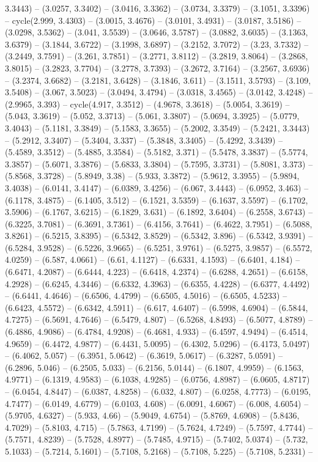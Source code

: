 3.3443) -- (3.0257, 3.3402) -- (3.0416, 3.3362) -- (3.0734, 3.3379) -- (3.1051, 3.3396) -- cycle(2.999, 3.4303) -- (3.0015, 3.4676) -- (3.0101, 3.4931) -- (3.0187, 3.5186) -- (3.0298, 3.5362) -- (3.041, 3.5539) -- (3.0646, 3.5787) -- (3.0882, 3.6035) -- (3.1363, 3.6379) -- (3.1844, 3.6722) -- (3.1998, 3.6897) -- (3.2152, 3.7072) -- (3.23, 3.7332) -- (3.2449, 3.7591) -- (3.261, 3.7851) -- (3.2771, 3.8112) -- (3.2819, 3.8064) -- (3.2868, 3.8015) -- (3.2823, 3.7704) -- (3.2778, 3.7393) -- (3.2672, 3.7164) -- (3.2567, 3.6936) -- (3.2374, 3.6682) -- (3.2181, 3.6428) -- (3.1846, 3.611) -- (3.1511, 3.5793) -- (3.109, 3.5408) -- (3.067, 3.5023) -- (3.0494, 3.4794) -- (3.0318, 3.4565) -- (3.0142, 3.4248) -- (2.9965, 3.393) -- cycle(4.917, 3.3512) -- (4.9678, 3.3618) -- (5.0054, 3.3619) -- (5.043, 3.3619) -- (5.052, 3.3713) -- (5.061, 3.3807) -- (5.0694, 3.3925) -- (5.0779, 3.4043) -- (5.1181, 3.3849) -- (5.1583, 3.3655) -- (5.2002, 3.3549) -- (5.2421, 3.3443) -- (5.2912, 3.3407) -- (5.3404, 3.337) -- (5.3848, 3.3405) -- (5.4292, 3.3439) -- (5.4589, 3.3512) -- (5.4885, 3.3584) -- (5.5182, 3.371) -- (5.5478, 3.3837) -- (5.5774, 3.3857) -- (5.6071, 3.3876) -- (5.6833, 3.3804) -- (5.7595, 3.3731) -- (5.8081, 3.373) -- (5.8568, 3.3728) -- (5.8949, 3.38) -- (5.933, 3.3872) -- (5.9612, 3.3955) -- (5.9894, 3.4038) -- (6.0141, 3.4147) -- (6.0389, 3.4256) -- (6.067, 3.4443) -- (6.0952, 3.463) -- (6.1178, 3.4875) -- (6.1405, 3.512) -- (6.1521, 3.5359) -- (6.1637, 3.5597) -- (6.1702, 3.5906) -- (6.1767, 3.6215) -- (6.1829, 3.631) -- (6.1892, 3.6404) -- (6.2558, 3.6743) -- (6.3225, 3.7081) -- (6.3691, 3.7361) -- (6.4156, 3.7641) -- (6.4622, 3.7951) -- (6.5088, 3.8261) -- (6.5215, 3.8395) -- (6.5342, 3.8529) -- (6.5342, 3.896) -- (6.5342, 3.9391) -- (6.5284, 3.9528) -- (6.5226, 3.9665) -- (6.5251, 3.9761) -- (6.5275, 3.9857) -- (6.5572, 4.0259) -- (6.587, 4.0661) -- (6.61, 4.1127) -- (6.6331, 4.1593) -- (6.6401, 4.184) -- (6.6471, 4.2087) -- (6.6444, 4.223) -- (6.6418, 4.2374) -- (6.6288, 4.2651) -- (6.6158, 4.2928) -- (6.6245, 4.3446) -- (6.6332, 4.3963) -- (6.6355, 4.4228) -- (6.6377, 4.4492) -- (6.6441, 4.4646) -- (6.6506, 4.4799) -- (6.6505, 4.5016) -- (6.6505, 4.5233) -- (6.6423, 4.5572) -- (6.6342, 4.5911) -- (6.617, 4.6407) -- (6.5998, 4.6904) -- (6.5844, 4.7275) -- (6.5691, 4.7646) -- (6.5479, 4.807) -- (6.5268, 4.8493) -- (6.5077, 4.8789) -- (6.4886, 4.9086) -- (6.4784, 4.9208) -- (6.4681, 4.933) -- (6.4597, 4.9494) -- (6.4514, 4.9659) -- (6.4472, 4.9877) -- (6.4431, 5.0095) -- (6.4302, 5.0296) -- (6.4173, 5.0497) -- (6.4062, 5.057) -- (6.3951, 5.0642) -- (6.3619, 5.0617) -- (6.3287, 5.0591) -- (6.2896, 5.046) -- (6.2505, 5.033) -- (6.2156, 5.0144) -- (6.1807, 4.9959) -- (6.1563, 4.9771) -- (6.1319, 4.9583) -- (6.1038, 4.9285) -- (6.0756, 4.8987) -- (6.0605, 4.8717) -- (6.0454, 4.8447) -- (6.0387, 4.8258) -- (6.032, 4.807) -- (6.0258, 4.7773) -- (6.0195, 4.7477) -- (6.0149, 4.6779) -- (6.0103, 4.608) -- (6.0091, 4.6067) -- (6.008, 4.6054) -- (5.9705, 4.6327) -- (5.933, 4.66) -- (5.9049, 4.6754) -- (5.8769, 4.6908) -- (5.8436, 4.7029) -- (5.8103, 4.715) -- (5.7863, 4.7199) -- (5.7624, 4.7249) -- (5.7597, 4.7744) -- (5.7571, 4.8239) -- (5.7528, 4.8977) -- (5.7485, 4.9715) -- (5.7402, 5.0374) -- (5.732, 5.1033) -- (5.7214, 5.1601) -- (5.7108, 5.2168) -- (5.7108, 5.225) -- (5.7108, 5.2331) -- 